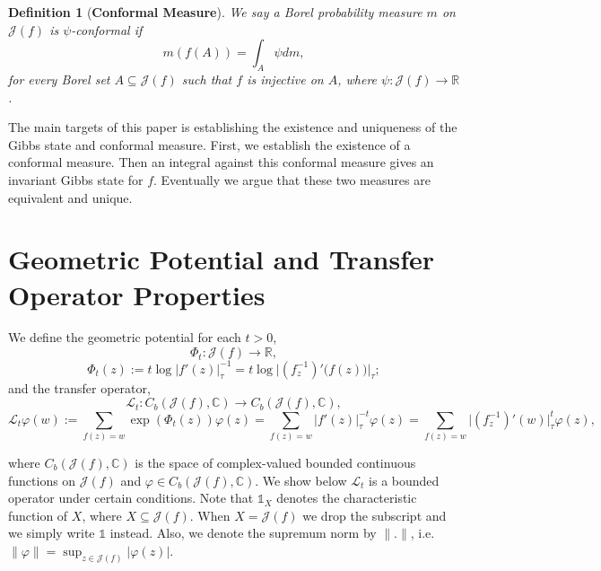 \documentclass[12pt,reqno]{amsart}
\newtheorem{definition}[theorem]{Definition}
\begin{document}
\begin{definition}[\textbf{Conformal Measure}]
    We say a Borel probability measure $m$ on $\mathcal{J}(f)$ is $\psi$-conformal if 
$$m(f(A))=\int_A\psi dm,$$
for every Borel set $A \subseteq \mathcal{J}(f)$ such that $f$ is injective on $A$, where $\psi: \mathcal{J}(f) \to \mathbb{R}$.
\end{definition}
\noindent The main targets of this paper is establishing the existence and uniqueness of the Gibbs state and conformal measure. First, we establish the existence of a conformal measure. Then an integral against this conformal measure gives an invariant Gibbs state for $f$. Eventually we argue that these two measures are equivalent and unique.
\section{Geometric Potential and Transfer Operator Properties}
\noindent We define the geometric potential for each $t>0$,
$$\Phi_t: \mathcal{J}(f) \to \mathbb{R},$$
\begin{equation}\label{potential function}
    \Phi_t(z):=t\log |f'(z)|^{-1}_{\tau}=t\log \big|(f_z^{-1})'\big(f(z)\big)\big|_{\tau};
\end{equation}
and the transfer operator,
$$\mathcal{L}_t: C_b(\mathcal{J}(f),\mathbb{C}) \to C_b(\mathcal{J}(f),\mathbb{C}),$$
\begin{equation}\label{transfer operator}
    \mathcal{L}_t \varphi(w):=\sum_{f(z)=w}\exp(\Phi_t(z))\varphi(z)=\sum_{f(z)=w}|f'(z)|_{\tau}^{-t}\varphi(z)=\sum_{f(z)=w} \big|(f_z^{-1})'(w)\big|_{\tau}^t\varphi(z),
\end{equation}

\noindent where $C_b(\mathcal{J}(f),\mathbb{C})$ is the space of complex-valued bounded continuous functions on $\mathcal{J}(f)$ and $\varphi \in C_b(\mathcal{J}(f),\mathbb{C})$. We show below $\mathcal{L}_t$ is a bounded operator under certain conditions. Note that $\mathbb{1}_X$ denotes the characteristic function of $X$, where $X \subseteq \mathcal{J}(f)$. When $X=\mathcal{J}(f)$ we drop the subscript and we simply write $\mathbb{1}$ instead. Also, we denote the supremum norm by $\| . \|$, i.e. $\| \varphi \|=\sup_{z \in \mathcal{J}(f)} |\varphi(z)|$. 
\end{document}
